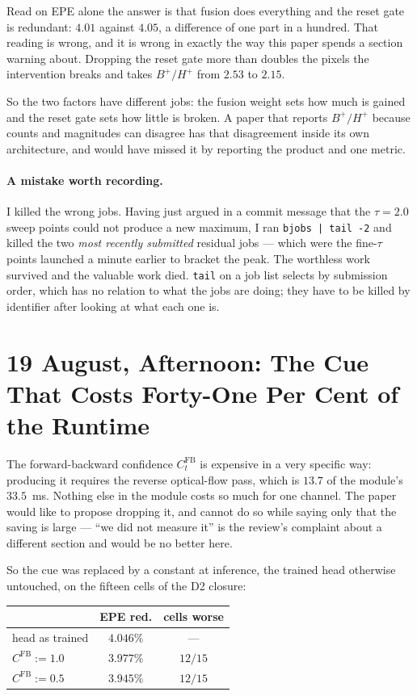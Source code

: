 \documentclass[11pt,a4paper]{article}
\begin{document}
Read on EPE alone the answer is that fusion does everything and the reset gate is
redundant: $4.01$ against $4.05$, a difference of one part in a hundred. That
reading is wrong, and it is wrong in exactly the way this paper spends a section
warning about. Dropping the reset gate more than doubles the pixels the
intervention breaks and takes $B^+/H^+$ from $2.53$ to $2.15$.

So the two factors have different jobs: the fusion weight sets how much is gained
and the reset gate sets how little is broken. A paper that reports $B^+/H^+$
because counts and magnitudes can disagree has that disagreement inside its own
architecture, and would have missed it by reporting the product and one metric.

\paragraph{A mistake worth recording.} I killed the wrong jobs. Having just
argued in a commit message that the $\tau{=}2.0$ sweep points could not produce a
new maximum, I ran \texttt{bjobs | tail -2} and killed the two \emph{most recently
submitted} residual jobs --- which were the fine-$\tau$ points launched a minute
earlier to bracket the peak. The worthless work survived and the valuable work
died. \texttt{tail} on a job list selects by submission order, which has no
relation to what the jobs are doing; they have to be killed by identifier after
looking at what each one is.

\section*{19 August, Afternoon: The Cue That Costs Forty-One Per Cent of the Runtime}

The forward-backward confidence $C^{\mathrm{FB}}_t$ is expensive in a very specific
way: producing it requires the reverse optical-flow pass, which is $13.7$ of the
module's $33.5$~ms. Nothing else in the module costs so much for one channel. The
paper would like to propose dropping it, and cannot do so while saying only that the
saving is large --- ``we did not measure it'' is the review's complaint about a
different section and would be no better here.

So the cue was replaced by a constant at inference, the trained head otherwise
untouched, on the fifteen cells of the D2 closure:

\begin{center}
\begin{tabular}{lcc}
\toprule
& EPE red. & cells worse \\
\midrule
head as trained & $4.046\%$ & --- \\
$C^{\mathrm{FB}} := 1.0$ & $3.977\%$ & $12/15$ \\
$C^{\mathrm{FB}} := 0.5$ & $3.945\%$ & $12/15$ \\
\bottomrule
\end{tabular}
\end{center}
\end{document}
